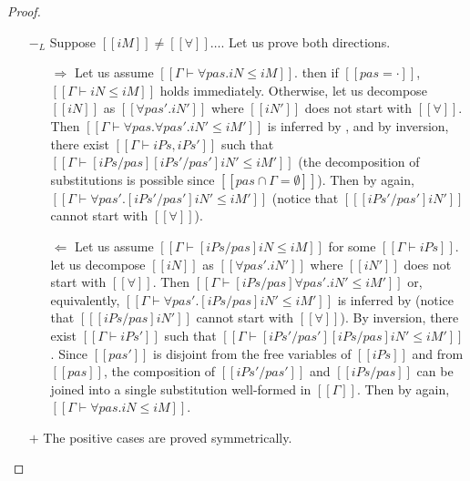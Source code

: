 \begin{proof}
\begin{itemize}
\begin{itemize}
      \end{itemize}
    \item [$-_{L}$] Suppose $[[iM]] \neq [[∀]]\dots$. Let us prove both directions.
      \begin{itemize}
        \item [$\Rightarrow$] Let us assume $[[Γ ⊢ ∀pas.iN ≤ iM]]$.
          then if $[[pas = ·]]$, $[[Γ ⊢ iN ≤ iM]]$ holds immediately.
          Otherwise, let us decompose  $[[iN]]$ as $[[∀pas'.iN']]$ where 
          $[[iN']]$ does not start with $[[∀]]$.
          Then $[[Γ ⊢ ∀pas.∀pas'.iN' ≤ iM']]$ is inferred by
          ,
          and by inversion, 
          there exist $[[Γ ⊢ iPs,iPs']]$ 
          such that $[[Γ ⊢ [iPs/pas][iPs'/pas']iN' ≤ iM']]$ 
          (the decomposition of substitutions is possible since $[[{pas} ∩ Γ = ∅]]$).
          Then by  again,
          $[[Γ ⊢ ∀pas'.[iPs'/pas']iN' ≤ iM']]$ (notice that $[[ [iPs'/pas']iN' ]]$ cannot
          start with $[[∀]]$).
        \item [$\Leftarrow$] Let us assume 
          $[[Γ ⊢ [iPs/pas]iN ≤ iM]]$ for some $[[Γ ⊢ iPs]]$.
          let us decompose $[[iN]]$ as $[[∀pas'.iN']]$ where $[[iN']]$ does not start with $[[∀]]$.
          Then $[[Γ ⊢ [iPs/pas]∀pas'.iN' ≤ iM']]$ or, equivalently,
          $[[Γ ⊢ ∀pas'.[iPs/pas]iN' ≤ iM']]$ is inferred by 
          (notice that $[[ [iPs/pas]iN' ]]$ cannot start with $[[∀]]$).
          By inversion, there exist $[[Γ ⊢ iPs']]$ such that 
          $[[Γ ⊢ [iPs'/pas'][iPs/pas]iN' ≤ iM']]$. Since $[[pas']]$ is disjoint
          from the free variables of $[[iPs]]$ and from $[[pas]]$, the composition of 
          $[[iPs'/pas']]$ and $[[iPs/pas]]$ can be joined into a single substitution
          well-formed in $[[Γ]]$. Then by  again,
          $[[Γ ⊢ ∀pas.iN ≤ iM]]$.
      \end{itemize}
      \item [$+$] The positive cases are proved symmetrically.
  \end{itemize}
\end{proof}

